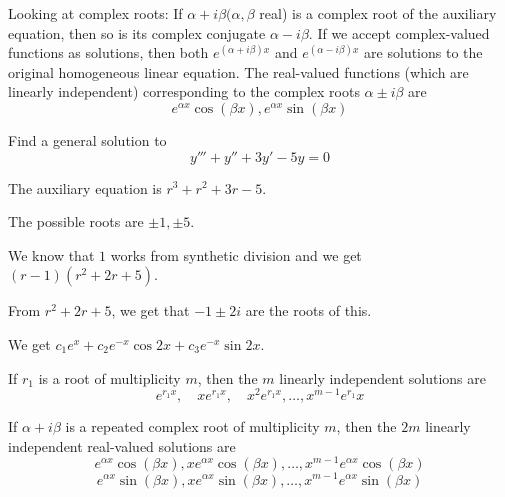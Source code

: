\documentclass[../diffeq.tex]{subfiles}
\begin{document}
Looking at complex roots: If $\alpha + i\beta (\alpha,\beta$ real) is a complex root of the auxiliary equation, then so is its complex conjugate $\alpha - i\beta$.
If we accept complex-valued functions as solutions, then both $e^{(\alpha+i\beta)x}$ and $e^{(\alpha-i\beta)x}$ are solutions to the original homogeneous linear equation.
The real-valued functions (which are linearly independent) corresponding to the complex roots $\alpha \pm i\beta$ are 
\[ e^{\alpha x}\cos(\beta x), e^{\alpha x}\sin(\beta x) \]

\begin{example}
    Find a general solution to 
    \[ y'''+y''+3y'-5y=0 \]

    The auxiliary equation is $r^3+r^2+3r-5$.

    The possible roots are $\pm 1,\pm 5$.

    We know that $1$ works from synthetic division and we get $(r-1)(r^2+2r+5)$.

    From $r^2+2r+5$, we get that $-1\pm 2i$ are the roots of this.

    We get $c_1e^x+c_2e^{-x}\cos 2x+c_3e^{-x}\sin 2x$.
\end{example}

If $r_1$ is a root of multiplicity $m$, then the $m$ linearly independent solutions are 
\[ e^{r_1x}, \quad xe^{r_1x}, \quad x^2e^{r_1x},\dots ,x^{m-1}e^{r_1}x \]

If $\alpha + i\beta$ is a repeated complex root of multiplicity $m$, then the $2m$ linearly independent real-valued solutions are 
\[ e^{\alpha x}\cos(\beta x), xe^{\alpha x}\cos(\beta x),\dots, x^{m-1}e^{\alpha x}\cos(\beta x) \]
\[ e^{\alpha x}\sin(\beta x), xe^{\alpha x}\sin(\beta x),\dots, x^{m-1}e^{\alpha x}\sin(\beta x) \]
\end{document}
